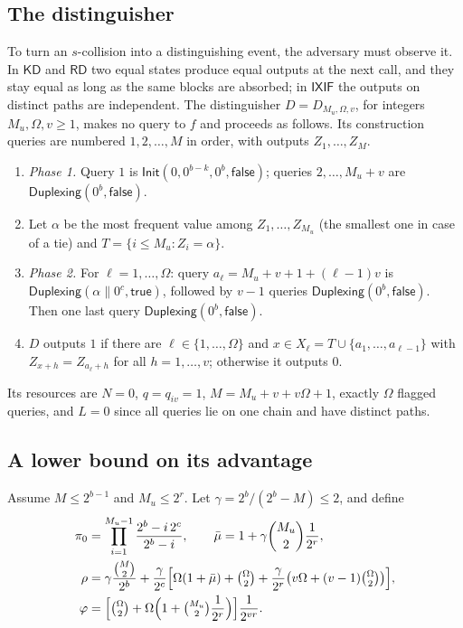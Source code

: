 \documentclass[11pt,a4paper]{article}
\theoremstyle{definition}
\theoremstyle{remark}
\newcommand{\KD}{\mathsf{KD}}
\newcommand{\RD}{\mathsf{RD}}
\newcommand{\IXIF}{\mathsf{IXIF}}
\newcommand{\true}{\mathsf{true}}
\newcommand{\false}{\mathsf{false}}
\begin{document}
\subsection{The distinguisher}
To turn an $s$-collision into a distinguishing event, the adversary must observe it. In $\KD$ and $\RD$ two equal states
produce equal outputs at the next call, and they stay equal as long as the same blocks are absorbed; in $\IXIF$ the
outputs on distinct paths are independent. The distinguisher $D = D_{M_u, \Omega, v}$, for integers
$M_u, \Omega, v \ge 1$, makes no query to $f$ and proceeds as follows. Its construction queries are numbered
$1, 2, \dots, M$ in order, with outputs $Z_1, \dots, Z_M$.
\begin{enumerate}[leftmargin=*,itemsep=1pt]
\item \emph{Phase 1.} Query $1$ is $\mathsf{Init}(0, 0^{b-k}, 0^b, \false)$; queries $2, \dots, M_u + v$ are
$\mathsf{Duplexing}(0^b, \false)$.
\item Let $\alpha$ be the most frequent value among $Z_1, \dots, Z_{M_u}$ (the smallest one in case of a tie) and
$T = \{ i \le M_u : Z_i = \alpha \}$.
\item \emph{Phase 2.} For $\ell = 1, \dots, \Omega$: query $a_\ell = M_u + v + 1 + (\ell - 1)v$ is
$\mathsf{Duplexing}(\alpha \| 0^c, \true)$, followed by $v - 1$ queries $\mathsf{Duplexing}(0^b, \false)$.
Then one last query $\mathsf{Duplexing}(0^b, \false)$.
\item $D$ outputs $1$ if there are $\ell \in \{1, \dots, \Omega\}$ and $x \in X_\ell = T \cup \{a_1, \dots, a_{\ell-1}\}$ with
$Z_{x+h} = Z_{a_\ell + h}$ for all $h = 1, \dots, v$; otherwise it outputs $0$.
\end{enumerate}
Its resources are $N = 0$, $q = q_{iv} = 1$, $M = M_u + v + v\Omega + 1$, exactly $\Omega$ flagged queries, and $L = 0$
since all queries lie on one chain and have distinct paths.

\subsection{A lower bound on its advantage}
Assume $M \le 2^{b-1}$ and $M_u \le 2^r$. Let $\gamma = 2^b/(2^b - M) \le 2$, and define
\begin{align*}
\pi_0 &= \prod_{i=1}^{M_u - 1} \frac{2^b - i\,2^c}{2^b - i}, \qquad \bar\mu = 1 + \gamma\binom{M_u}{2}\frac{1}{2^r}, \\
\rho &= \gamma\frac{\binom{M}{2}}{2^b} + \frac{\gamma}{2^c}\Bigl[\Omega(1 + \bar\mu) + \tbinom{\Omega}{2}
 + \frac{\gamma}{2^r}\bigl(v\Omega + (v-1)\tbinom{\Omega}{2}\bigr)\Bigr], \\
\varphi &= \Bigl[\tbinom{\Omega}{2} + \Omega\Bigl(1 + \tbinom{M_u}{2}\frac{1}{2^r}\Bigr)\Bigr]\frac{1}{2^{vr}} .
\end{align*}
\end{document}
